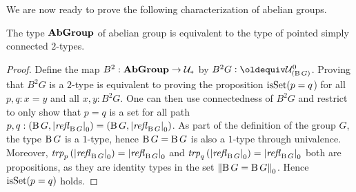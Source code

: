 We are now ready to prove the following characterization of abelian
groups.
\begin{theorem}
  The type $\mathbf{AbGroup}$ of abelian group is equivalent to the type
  of pointed simply connected $2$-types.
\end{theorem}
\begin{proof}%
  \newcommand{\BB}{B^2}%
  \newcommand{\UUptd}{\UU_\ast}%
  Define the map $\BB : \typeabgroup \to \UUptd$ by
  $\BB G\defequi \univcover{\UU}{\clf G}$. Proving that $\BB G$ is a
  $2$-type is equivalent to proving the proposition $\mathrm{isSet}(p=q$) for
  all $p,q:x=y$ and all $x,y:\BB G$. One can then use connectedness of
  $\BB G$ and restrict to only show that $p=q$ is a set for all path
  $p,q:({\operatorname{B} G},{\lvert\mathop{\mathit{refl}_{\operatorname{B} G}}\rvert}_0)=({\operatorname{B} G},{\lvert\mathop{\mathit{refl}_{\operatorname{B} G}}\rvert}_0)$. As part
  of the definition of the group $G$, the type ${\operatorname{B} G}$ is a $1$-type,
  hence ${\operatorname{B} G}={\operatorname{B} G}$ is also a $1$-type through univalence. Moreover,
  $\trp p {(\settrunc{\refl {\clf G}}}) = \settrunc{\refl {\clf G}}$ and
  $\trp q {(\settrunc{\refl {\clf G}}}) = \settrunc{\refl {\clf G}}$ both are
  propositions, as they are identity types in the set
  ${\lVert{\operatorname{B}G}={\operatorname{B} G}\rVert}_0$. Hence $\mathrm{isSet}(p=q)$ holds.


\end{proof}
